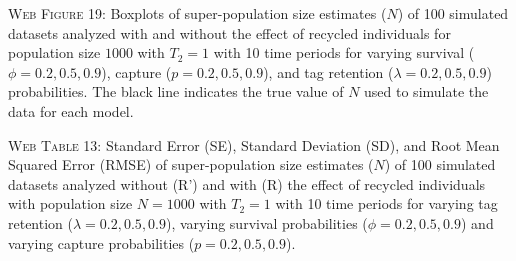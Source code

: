 \documentclass[]{article}
\begin{document}
\textsc{Web Figure 19:} Boxplots of super-population size estimates
(\(N\)) of 100 simulated datasets analyzed with and without the effect
of recycled individuals for population size \(1000\) with \(T_2=1\) with
10 time periods for varying survival (\(\phi=0.2,0.5,0.9\)), capture
(\(p=0.2,0.5,0.9\)), and tag retention (\(\lambda=0.2,0.5,0.9\))
probabilities. The black line indicates the true value of \(N\) used to
simulate the data for each model.

\textsc{Web Table 13:} Standard Error (SE), Standard Deviation (SD), and
Root Mean Squared Error (RMSE) of super-population size estimates
(\(N\)) of 100 simulated datasets analyzed without (R') and with (R) the
effect of recycled individuals with population size \(N=1000\) with
\(T_2=1\) with 10 time periods for varying tag retention
(\(\lambda=0.2,0.5,0.9\)), varying survival probabilities
(\(\phi=0.2,0.5,0.9\)) and varying capture probabilities
(\(p=0.2,0.5,0.9\)).
\end{document}
